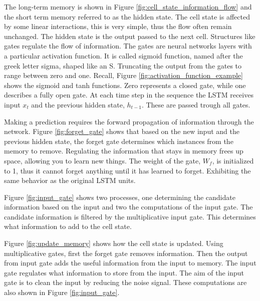 The long-term memory is shown in Figure \ref{fig:cell_state_information_flow} and the short term memory referred to as the hidden state. The cell state is affected by some linear interactions, this is very simple, thus the flow often remain unchanged. The hidden state is the output passed to the next cell. Structures like gates regulate the flow of information. The gates are neural networks layers with a particular activation function. It is called sigmoid function, named after the greek letter sigma, shaped like an S. Truncating the output from the gates to range between zero and one. Recall, Figure \ref{fig:activation_function_example} shows the sigmoid and tanh functions. Zero represents a closed gate, while one describes a fully open gate. At each time step in the sequence the LSTM receives input $x_t$ and the previous hidden state, $h_{t-1}$. These are passed trough all gates.

Making a prediction requires the forward propagation of information through the network. Figure \ref{fig:forget_gate} shows that based on the new input and the previous hidden state, the forget gate determines which instances from the memory to remove. Regulating the information that stays in memory frees up space, allowing you to learn new things. The weight of the gate, $W_f$, is initialized to 1, thus it cannot forget anything until it has learned to forget. Exhibiting the same behavior as the original LSTM units. 

Figure \ref{fig:input_gate} shows two processes, one determining the candidate information based on the input and two the computations of the input gate. The candidate information is filtered by the multiplicative input gate. This determines what information to add to the cell state.

Figure \ref{fig:update_memory} shows how the cell state is updated. Using multiplicative gates, first the forget gate removes information. Then the output from input gate adds the useful information from the input to memory. The input gate regulates what information to store from the input. The aim of the input gate is to clean the input by reducing the noise signal. These computations are also shown in Figure \ref{fig:input_gate}.


